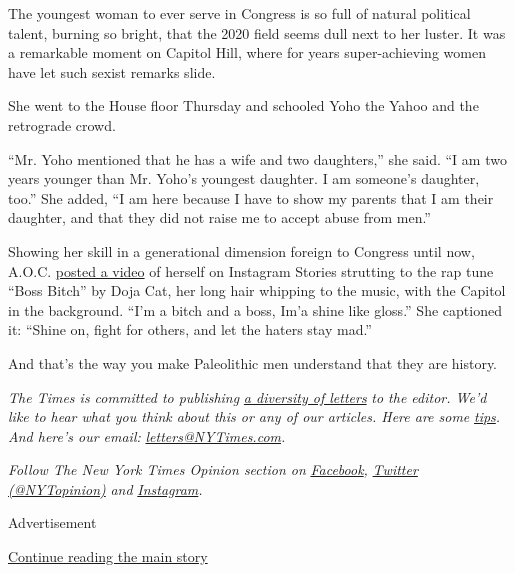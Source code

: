 The youngest woman to ever serve in Congress is so full of natural
political talent, burning so bright, that the 2020 field seems dull next
to her luster. It was a remarkable moment on Capitol Hill, where for
years super-achieving women have let such sexist remarks slide.

She went to the House floor Thursday and schooled Yoho the Yahoo and the
retrograde crowd.

``Mr. Yoho mentioned that he has a wife and two daughters,'' she said.
``I am two years younger than Mr. Yoho's youngest daughter. I am
someone's daughter, too.'' She added, ``I am here because I have to show
my parents that I am their daughter, and that they did not raise me to
accept abuse from men.''

Showing her skill in a generational dimension foreign to Congress until
now, A.O.C.
\href{https://twitter.com/itsbecrose/status/1285692799812341760?ref_src=twsrc\%5Etfw\%7Ctwcamp\%5Etweetembed\%7Ctwterm\%5E1285692799812341760\%7Ctwgr\%5E\&ref_url=https\%3A\%2F\%2Fwww.foxnews.com\%2Fpolitics\%2Faoc-posts-boss-video-yoho-confrontation}{posted
a video} of herself on Instagram Stories strutting to the rap tune
``Boss Bitch'' by Doja Cat, her long hair whipping to the music, with
the Capitol in the background. ``I'm a bitch and a boss, Im'a shine like
gloss.'' She captioned it: ``Shine on, fight for others, and let the
haters stay mad.''

And that's the way you make Paleolithic men understand that they are
history.

\emph{The Times is committed to publishing}
\href{https://www.nytimes3xbfgragh.onion/2019/01/31/opinion/letters/letters-to-editor-new-york-times-women.html}{\emph{a
diversity of letters}} \emph{to the editor. We'd like to hear what you
think about this or any of our articles. Here are some}
\href{https://help.nytimes3xbfgragh.onion/hc/en-us/articles/115014925288-How-to-submit-a-letter-to-the-editor}{\emph{tips}}\emph{.
And here's our email:}
\href{mailto:letters@NYTimes.com}{\emph{letters@NYTimes.com}}\emph{.}

\emph{Follow The New York Times Opinion section on}
\href{https://www.facebookcorewwwi.onion/nytopinion}{\emph{Facebook}}\emph{,}
\href{http://twitter.com/NYTOpinion}{\emph{Twitter (@NYTopinion)}}
\emph{and}
\href{https://www.instagram.com/nytopinion/}{\emph{Instagram}}\emph{.}

Advertisement

\protect\hyperlink{after-bottom}{Continue reading the main story}

